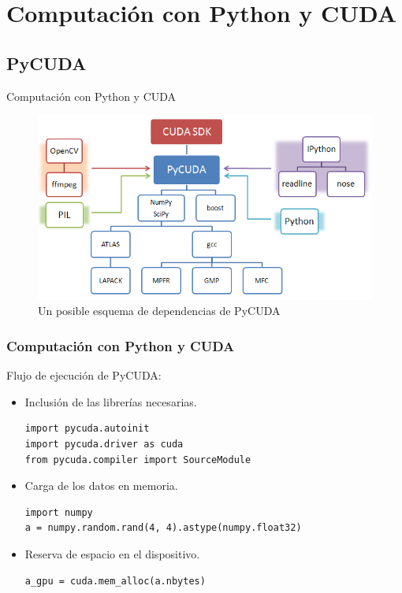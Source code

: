 \documentclass{beamer}
\begin{document}
\section{Computación con Python y CUDA}

\subsection{PyCUDA}

\begin{frame}{Computación con Python y CUDA}
  \begin{figure}
    \begin{center}
      \includegraphics[width=.8\textwidth]{installedDependecies.png}
      \caption{Un posible esquema de dependencias de PyCUDA}
    \end{center}
  \end{figure}
\end{frame}

\begin{frame}[fragile]
\frametitle{Computación con Python y CUDA}

  Flujo de ejecución de PyCUDA:
  \begin{itemize}
    \item Inclusión de las librerías necesarias.
    \begin{lstlisting}
import pycuda.autoinit
import pycuda.driver as cuda
from pycuda.compiler import SourceModule
    \end{lstlisting}
   
    \item Carga de los datos en memoria.
    \begin{lstlisting}
import numpy
a = numpy.random.rand(4, 4).astype(numpy.float32)
    \end{lstlisting}

    \item Reserva de espacio en el dispositivo.
    \begin{lstlisting}
a_gpu = cuda.mem_alloc(a.nbytes)
    \end{lstlisting}

  \end{itemize}

\end{frame}
\end{document}
